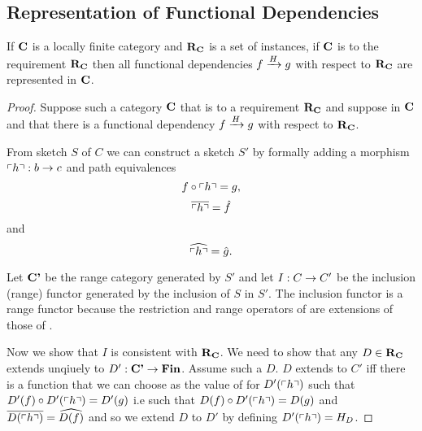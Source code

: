 
\subsection{Representation of Functional Dependencies}

\begin{lemma}
If $\catc$ is a locally finite \rangeplus category and $\reqtc$ is a set of instances, if $\catc$ is 
 to the requirement $\reqtc$ then
all functional dependencies $\fundep{H}{f}{g}$  with respect to $\reqtc$ are represented in $\catc$.
\end{lemma}
\begin{proof}

Suppose such a category  $\catc$  that  is 
 to a requirement $\reqtc$ and suppose
\fgsourcediag
in $\catc$ 
and that there is a functional dependency $\fundep{H}{f}{g}$ with respect to $\reqtc$.

From sketch $S$ of $C$ we can construct a sketch $S'$ by formally 
adding a morphism $\qq{h}: b \morph c$
and path equivalences 
\begin{equation}
\label{hquote}
f \circ \qq{h} = g,
\end{equation} 
\begin{equation}
\label{hquotebar}
\overline{\qq{h}}=\hat{f}
\end{equation} 
and 
\begin{equation}
\label{hquotehat}
\widehat{\qq{h}}=\hat{g}. 
\end{equation}

Let $\catcp$ be the range category generated by $S'$ and
let $I: C \morph C'$ be the inclusion (range) functor 
generated by the inclusion of $S$ in $S'$. 
The inclusion functor is a range functor because the restriction and range operators of \catcpw are extensions of those
of \catc.

Now we show that $I$ is consistent with $\reqtc$. 
We need to show that any $D \in \reqtc$
extends unqiuely to $D' :\catcp \morph \Fin$. Assume such a $D$. 
$D$  extends to $C'$ iff there is a  function that we can choose as the value of  for $D'(\qq{h})$  such that $D'(f) \circ D'(\qq{h}) = D'(g)$ i.e such that
$D(f) \circ D'(\qq{h}) = D(g)$ and $\overline{D(\qq{h})}=\widehat{D(f)}$
and so we  extend $D$ to $D'$ 
 by defining $D'(\qq{h})=H_D$.


\end{proof}
